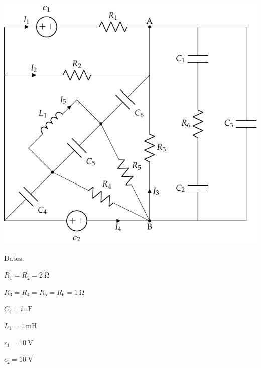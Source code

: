 \begin{enumerate}
    \begin{minipage}{0.65\linewidth}
      \includegraphics[scale=0.9]{figs/BT1_ej14_enunciado.pdf}
    \end{minipage}
    \begin{minipage}{0.35\linewidth}
    
        \hspace{5mm}Datos:
    
        \vspace{2mm}    
        \hspace{5mm}$R_1 = R_2 = \qty{2}{\ohm}$
    
        \vspace{1mm}
        \hspace{5mm}$R_3 = R_4 = R_5 = R_6 = \qty{1}{\ohm}$
    
        \vspace{1mm}
        \hspace{5mm}$C_i = i\,\si{\micro\farad}$
    
        \vspace{1mm}
        \hspace{5mm}$L_1 = 1\,\si{\milli\henry}$
    
        \vspace{1mm}
        \hspace{5mm}$\epsilon_1 = \qty{10}{\volt}$
    
        \vspace{1mm}
        \hspace{5mm}$\epsilon_2 = \qty{10}{\volt}$
        

\end{minipage}
\end{enumerate}
